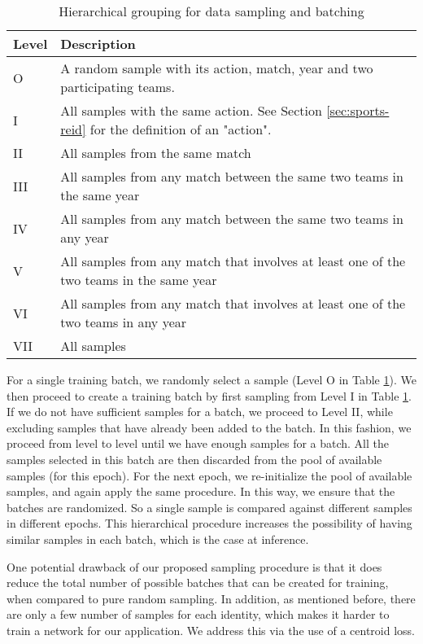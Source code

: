 \documentclass{article}
\begin{document}
\begin{table}
  \caption{Hierarchical grouping for data sampling and batching}
  \label{table:hierarchical_levels}
  \centering
  \begin{tabular}{ll}
    \toprule
Level     & Description  \\
    \midrule
    O & A random sample with its action, match, year and two participating teams. \\
    I & All samples with the same action. See Section \ref{sec:sports-reid} for the definition of an "action". \\
    II  & All samples from the same match \\
    III  & All samples from any match between the same two teams in the same year \\
    IV & All samples from any match between the same two teams in any year \\
    V & All samples from any match that involves at least one of the two teams in the same year\\
    VI & All samples from any match that involves at least one of the two teams in any year \\
    VII & All samples\\
    \bottomrule
  \end{tabular}
\end{table}

For a single training batch, we randomly select a sample (Level O in Table \ref{table:hierarchical_levels}). We then proceed to create a training batch by first sampling from Level I in Table \ref{table:hierarchical_levels}. If we do not have sufficient samples for a batch, we proceed to Level II, while excluding samples that have already been added to the batch. In this fashion, we proceed from level to level until we have enough samples for a batch. All the samples selected in this batch are then discarded from the pool of available samples (for this epoch). For the next epoch, we re-initialize the pool of available samples, and again apply the same procedure. In this way, we ensure that the batches are randomized. So a single sample is compared against different samples in different epochs. This hierarchical procedure increases the possibility of having similar samples in each batch, which is the case at inference. 

One potential drawback of our proposed sampling procedure is that it does reduce the total number of possible batches that can be created for training, when compared to pure random sampling. In addition, as mentioned before, there are only a few number of samples for each identity, which makes it harder to train a network for our application. We address this via the use of a centroid loss.
\end{document}
